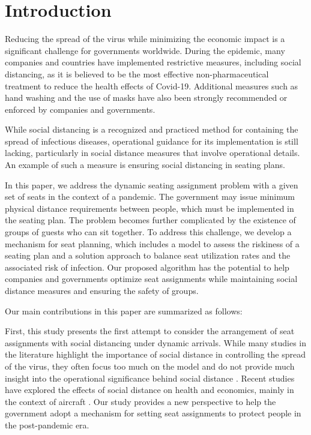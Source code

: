 \section{Introduction}

Reducing the spread of the virus while minimizing the economic impact is a significant challenge for governments worldwide. During the epidemic, many companies and countries have implemented restrictive measures, including social distancing, as it is believed to be the most effective non-pharmaceutical treatment to reduce the health effects of Covid-19. Additional measures such as hand washing and the use of masks have also been strongly recommended or enforced by companies and governments.

While social distancing is a recognized and practiced method for containing the spread of infectious diseases, operational guidance for its implementation is still lacking, particularly in social distance measures that involve operational details. An example of such a measure is ensuring social distancing in seating plans.

In this paper, we address the dynamic seating assignment problem with a given set of seats in the context of a pandemic. The government may issue minimum physical distance requirements between people, which must be implemented in the seating plan. The problem becomes further complicated by the existence of groups of guests who can sit together. To address this challenge, we develop a mechanism for seat planning, which includes a model to assess the riskiness of a seating plan and a solution approach to balance seat utilization rates and the associated risk of infection.
Our proposed algorithm has the potential to help companies and governments optimize seat assignments while maintaining social distance measures and ensuring the safety of groups.



Our main contributions in this paper are summarized as follows:

First, this study presents the first attempt to consider the arrangement of seat assignments with social distancing under dynamic arrivals. While many studies in the literature highlight the importance of social distance in controlling the spread of the virus, they often focus too much on the model and do not provide much insight into the operational significance behind social distance \cite{barry2021optimal, fischetti2021safe}. Recent studies have explored the effects of social distance on health and economics, mainly in the context of aircraft \cite{salari2020social, ghorbani2020model, salari2022social}. Our study provides a new perspective to help the government adopt a mechanism for setting seat assignments to protect people in the post-pandemic era.


